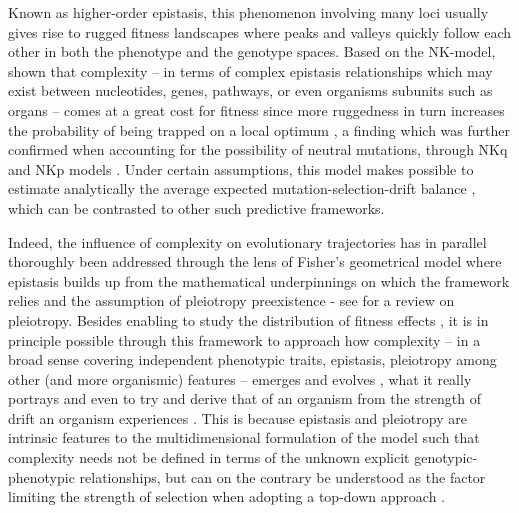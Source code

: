 \documentclass[11pt,onecolumn]{article}
\begin{document}
Known as higher-order epistasis, this phenomenon involving many loci usually gives rise to rugged fitness landscapes \citep{Kauffman87,Kauffman89,Weinreich13} where peaks and valleys quickly follow each other in both the phenotype and the genotype spaces. Based on the NK-model, \citet{Kauffman87} shown that complexity -- in terms of complex epistasis relationships which may exist between nucleotides, genes, pathways, or even organisms subunits such as organs -- comes at a great cost for fitness since more ruggedness in turn increases the probability of being trapped on a local optimum \citep{Kauffman87,Geard02}, a finding which was further confirmed when accounting for the possibility of neutral mutations, through NKq and NKp models \citep{Barnett98,Newman98,Geard02}. Under certain assumptions, this model makes possible to estimate analytically the average expected mutation-selection-drift balance \citep{Weinberger91}, which can be contrasted to other such predictive frameworks.

Indeed, the influence of complexity on evolutionary trajectories has in parallel thoroughly been addressed through the lens of Fisher's geometrical model \citep{Fisher30,Orr98,Orr00,Martin06,Tenaillon07,Tenaillon14} where epistasis builds up from the mathematical underpinnings on which the framework relies \citep{Hartl96,Orr00,Tenaillon14} and the assumption of pleiotropy preexistence \citep{Tenaillon14} - see \citep{Stearns10} for a review on pleiotropy. Besides enabling to study the distribution of fitness effects \citep{Martin06,Lourenco11}, it is in principle possible through this framework to approach how complexity -- in a broad sense covering independent phenotypic traits, epistasis, pleiotropy among other (and more organismic) features -- emerges and evolves \citep{Orr98,Martin07,Gros09,Le-Nagard11}, what it really portrays and even to try and derive that of an organism from the strength of drift an organism experiences \citep{Tenaillon07}. This is because epistasis and pleiotropy are intrinsic features to the multidimensional formulation of the model \citep{Tenaillon14} such that complexity needs not be defined in terms of the unknown explicit genotypic-phenotypic relationships, but can on the contrary be understood as the factor limiting the strength of selection when adopting a top-down approach \citep{Le-Nagard11}.\\
\end{document}
